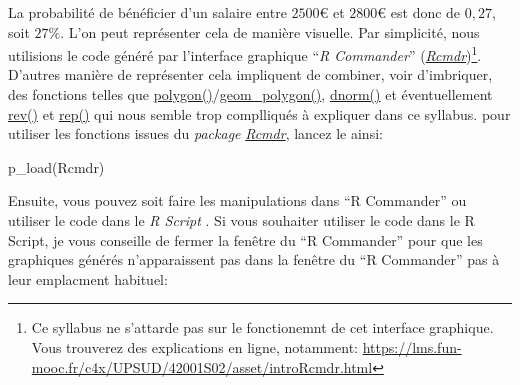 \documentclass[
]{book}
\newenvironment{Shaded}{\begin{snugshade}}{\end{snugshade}}
\newcommand{\FunctionTok}[1]{\textcolor[rgb]{0.00,0.00,0.00}{#1}}
\newcommand{\NormalTok}[1]{#1}
\begin{document}
La probabilité de bénéficier d'un salaire entre \(2500€\) et \(2800€\) est donc de \(0,27\), soit \(27\%\). L'on peut représenter cela de manière visuelle. Par simplicité, nous utilisions le code généré par l'interface graphique ``\emph{R Commander}'' (\href{https://cran.r-project.org/web/packages/Rcmdr/index.html}{\emph{Rcmdr}})\footnote{Ce syllabus ne s'attarde pas sur le fonctionemnt de cet interface graphique. Vous trouverez des explications en ligne, notamment: \url{https://lms.fun-mooc.fr/c4x/UPSUD/42001S02/asset/introRcmdr.html}}. D'autres manière de représenter cela impliquent de combiner, voir d'imbriquer, des fonctions telles que \href{https://www.rdocumentation.org/packages/graphics/versions/3.6.2/topics/polygon}{polygon()}/\href{https://ggplot2.tidyverse.org/reference/geom_polygon.html}{geom\_polygon()}, \href{https://stat.ethz.ch/R-manual/R-devel/library/stats/html/Normal.html}{dnorm()} et éventuellement \href{https://www.rdocumentation.org/packages/base/versions/3.6.2/topics/rev}{rev()} et \href{https://www.rdocumentation.org/packages/base/versions/3.6.2/topics/rep}{rep()} qui nous semble trop complliqués à expliquer dans ce syllabus. pour utiliser les fonctions issues du \emph{package} \href{https://cran.r-project.org/web/packages/Rcmdr/index.html}{\emph{Rcmdr}}, lancez le ainsi:

\begin{Shaded}
\begin{Highlighting}[]
\FunctionTok{p\_load}\NormalTok{(Rcmdr)}
\end{Highlighting}
\end{Shaded}

Ensuite, vous pouvez soit faire les manipulations dans ``R Commander'' ou utiliser le code dans le \emph{R Script }. Si vous souhaiter utiliser le code dans le R Script, je vous conseille de fermer la fenêtre du ``R Commander'' pour que les graphiques générés n'apparaissent pas dans la fenêtre du ``R Commander'' pas à leur emplacment habituel:
\end{document}
